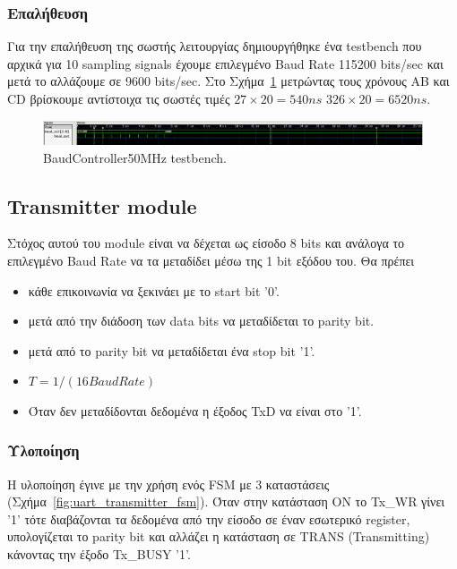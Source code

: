 \documentclass[../main.tex]{subfiles}
\begin{document}
\subsubsection*{Επαλήθευση}
Για την επαλήθευση της σωστής λειτουργίας δημιουργήθηκε ένα testbench που αρχικά
για 10 sampling signals έχουμε επιλεγμένο Baud Rate 115200 bits/sec και μετά το
αλλάζουμε σε 9600 bits/sec. Στο Σχήμα~\ref{fig:baud_controller_tb} μετρώντας
τους χρόνους AB και CD βρίσκουμε αντίστοιχα τις σωστές τιμές $27\times20=540ns$ 
$326\times20=6520ns$.

\begin{figure}[H]
  \begin{center}
    \includegraphics[width=\textwidth]{../images/baud_controller_tb.png}
  \end{center}
  \caption{BaudController50MHz testbench.}
  \label{fig:baud_controller_tb}
\end{figure}


\subsection{Transmitter module}

Στόχος αυτού του module είναι να δέχεται ως είσοδο 8 bits και ανάλογα το
επιλεγμένο Baud Rate να τα μεταδίδει μέσω της 1 bit εξόδου του. Θα πρέπει 

\begin{itemize}
  \item κάθε επικοινωνία να ξεκινάει με το start bit '0'.
  \item μετά από την διάδοση των data bits να μεταδίδεται το parity bit.
  \item μετά από το parity bit να μεταδίδεται ένα stop bit '1'.
  \item $T = 1/(16 BaudRate)$
  \item Όταν δεν μεταδίδονται δεδομένα η έξοδος TxD να είναι στο '1'.
\end{itemize}

\subsubsection*{Υλοποίηση}

Η υλοποίηση έγινε με την χρήση ενός FSM με 3 καταστάσεις
(Σχήμα~\ref{fig:uart_transmitter_fsm}). Όταν στην κατάσταση ON το Tx\_WR γίνει
'1' τότε διαβάζονται τα δεδομένα από την είσοδο σε έναν εσωτερικό register,
υπολογίζεται το parity bit και αλλάζει η κατάσταση σε TRANS (Transmitting)
κάνοντας την έξοδο Tx\_BUSY '1'. 
\end{document}
